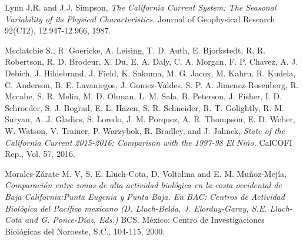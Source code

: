 \documentclass{article} %
\begin{document}
\begin{thebibliography}{10}
 \hypertarget{lynn}{}
Lynn J.R. and J.J. Simpson,
\textit{The California Current System: The Seasonal Variability of its Physical Characteristics.} 
Journal of Geophysical Research 92(C12), 12.947-12.966, 1987.


 \hypertarget{mcclatchie}{}
Mcclatchie S., R. Goericke, A. Leising, T. D. Auth, E. Bjorkstedt, R. R. Robertson, R. D. Brodeur, X. Du, E. A. Daly, C. A. Morgan, F. P. Chavez, A. J. Debich, J. Hildebrand, J. Field, K. Sakuma, M. G. Jacox, M. Kahru, R. Kudela, C. Anderson, B. E. Lavaniegos, J. Gomez-Valdes, S. P. A. Jimenez-Rosenberg, R. Mccabe, S. R. Melin, M. D. Ohman, L. M. Sala, B. Peterson, J. Fisher, I. D. Schroeder, S. J. Bograd, E. L. Hazen, S. R. Schneider, R. T. Golightly, R. M. Suryan, A. J. Gladics, S. Loredo, J. M. Porquez, A. R. Thompson, E. D. Weber, W. Watson, V. Trainer, P. Warzybok, R. Bradley, and J. Jahnck,
\textit{State of the California Current 2015-2016: Comparison with the 1997-98 El Niño.} 
CalCOFI Rep., Vol. 57, 2016.

 \hypertarget{morales}{}
Morales-Zárate M. V, S. E. Lluch-Cota, D. Voltolina and E. M. Muñoz-Mejía,
\textit{Comparación entre zonas de alta actividad biológica en la costa occidental de Baja California:Punta Eugenia y Punta Baja. En BAC: Centros de Actividad Biológica del Pacífico mexicano (D. Lluch-Belda, J. Elorduy-Garay, S.E. Lluch-Cota and G. Ponce-Díaz, Eds.)} 
BCS. México: Centro de Investigaciones Biológicas del Noroeste, S.C., 104-115, 2000.

\end{thebibliography}
\end{document}
